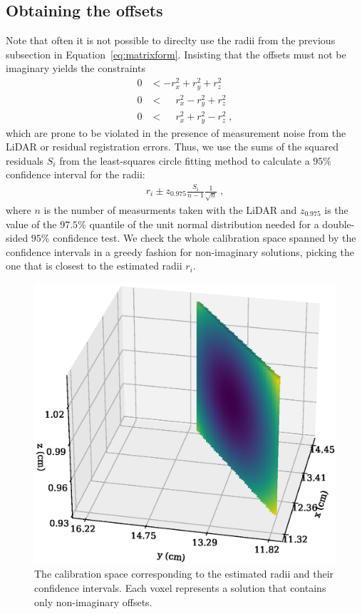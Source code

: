 \subsection{Obtaining the offsets}
Note that often it is not possible to direclty use the radii from the previous subsection in Equation~\eqref{eq:matrixform}.
Insisting that the offsets must not be imaginary yields the constraints
\begin{align}
  0 &< -r_x^2 + r_y^2 + r_z^2 \nonumber \\
  0 &< \phantom{-}r_x^2 - r_y^2 + r_z^2 \nonumber \\
  0 &< \phantom{-}r_x^2 + r_y^2 - r_z^2 \;,
\end{align}
which are prone to be violated in the presence of measurement noise from the LiDAR or residual registration errors.
Thus, we use the sums of the squared residuals $S_i$ from the least-squares circle fitting method to calculate a $95\%$ confidence interval for the radii:
\begin{align}
  r_i \pm z_{0.975} \frac{S_i}{n-1} \frac{1}{\sqrt{n}} \;,
\end{align}
where $n$ is the number of measurments taken with the LiDAR and $z_{0.975}$ is the value of the $97.5\%$ quantile of the unit normal distribution needed for a double-sided $95\%$ confidence test.
We check the whole calibration space spanned by the confidence intervals in a greedy fashion for non-imaginary solutions, picking the one that is closest to the estimated radii $r_i$.
\begin{figure}
  \centering 
  \includegraphics[width=\linewidth]{img/calibspace}
  \caption{The calibration space corresponding to the estimated radii and their confidence intervals.
  Each voxel represents a solution that contains only non-imaginary offsets.}
  \label{fig:calibspace}
\end{figure}

